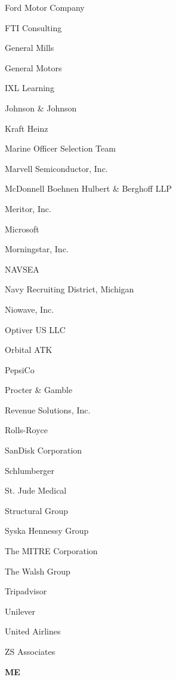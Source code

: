 \documentclass[twoside]{article}
\begin{document}
\begin{center}
\begin{multicols}{5}
\begin{FlushLeft}
\begin{compactitem}
\item Ford Motor Company
\item FTI Consulting
\item General Mills
\item General Motors
\item IXL Learning
\item Johnson \& Johnson
\item Kraft Heinz
\item Marine Officer Selection Team
\item Marvell Semiconductor, Inc.
\item McDonnell Boehnen Hulbert \& Berghoff LLP
\item Meritor, Inc.
\item Microsoft
\item Morningstar, Inc.
\item NAVSEA
\item Navy Recruiting District, Michigan
\item Niowave, Inc.
\item Optiver US LLC
\item Orbital ATK
\item PepsiCo
\item Procter \& Gamble
\item Revenue Solutions, Inc.
\item Rolls-Royce
\item SanDisk Corporation
\item Schlumberger
\item St. Jude Medical
\item Structural Group
\item Syska Hennessy Group
\item The MITRE Corporation
\item The Walsh Group
\item Tripadvisor
\item Unilever
\item United Airlines
\item ZS Associates
\end{compactitem}
        \end{FlushLeft}
        \vspace{1em}
        {\fontsize{14}{16}\selectfont \bf ME}\\
        \vspace{-1em}
        ~\hrulefill~
        \vspace{-.9em}
        \begin{FlushLeft}
        \begin{compactitem}

\end{compactitem}
\end{FlushLeft}
\end{multicols}
\end{center}
\end{document}
